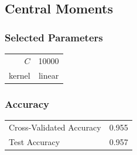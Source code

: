 \documentclass[12pt]{article}
\begin{document}
\newpage
{}

\subsection*{Central Moments}
\subsubsection*{Selected Parameters}
	\hspace{1cm}
	\begin{tabular}{r|c}
	\(C\) & 10000 \\
	kernel & linear \\
	\end{tabular}

\subsubsection*{Accuracy}
	\hspace{1cm}
	\begin{tabular}{l|c}
	Cross-Validated Accuracy & 0.955\\
	Test Accuracy & 0.957\\
	\end{tabular}
\end{document}
